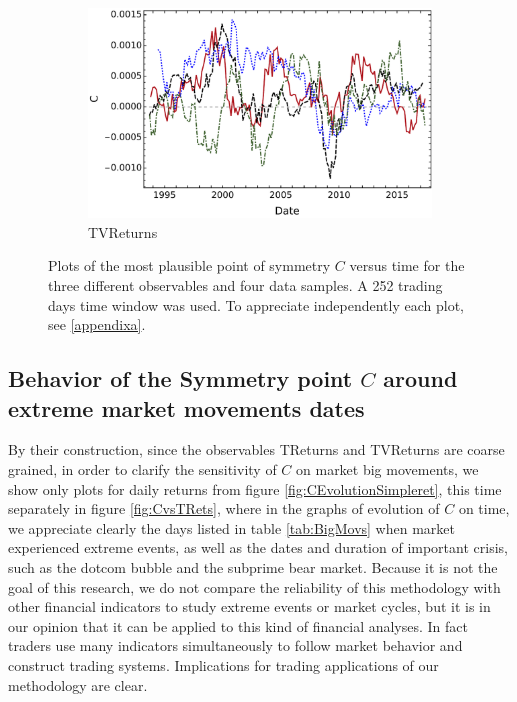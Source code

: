 \documentclass{elsarticle}
\begin{document}
\begin{figure}[htb!]
\begin{subfigure}[b]{0.475\textwidth}
            \includegraphics[width=\textwidth]{figures/timesymmetry/simetria_tiempo_trendvel.pdf}
            \caption[ ]{{TVReturns}}
            \label{fig:CEvolutionTrendvel}
        \end{subfigure}
        \caption[Plots of the most plausible point of symmetry $C$ versus time for our four different markets series data]
        {\small Plots of the most plausible point of symmetry $C$ versus time for the three different observables and four data samples. A 252 trading days time window was used. To appreciate independently each plot, see \ref{appendixa}.} 
        \label{fig:CEvolution}
\end{figure}

\subsection{Behavior of the Symmetry point $C$ around extreme market movements dates}
\label{extreme}
By their construction, since the  observables TReturns and TVReturns are coarse grained, in order to clarify the sensitivity of $C$ on market big movements, we show only plots for daily returns from figure \ref{fig:CEvolutionSimpleret}, this time separately in figure \ref{fig:CvsTRets}, where in the graphs of evolution of $C$ on time, we appreciate clearly the days listed in table \ref{tab:BigMovs} when market experienced extreme events, as well as the dates and duration of important crisis, such as the dotcom bubble and the subprime bear market. Because it is not the goal of this research, we do not compare the reliability of this methodology with other financial indicators to study extreme events or market cycles, but it is in our opinion that it can be applied to this kind of financial analyses. In fact traders use many indicators simultaneously to follow market behavior and construct trading systems. Implications for trading applications of our methodology are clear.
\end{document}
